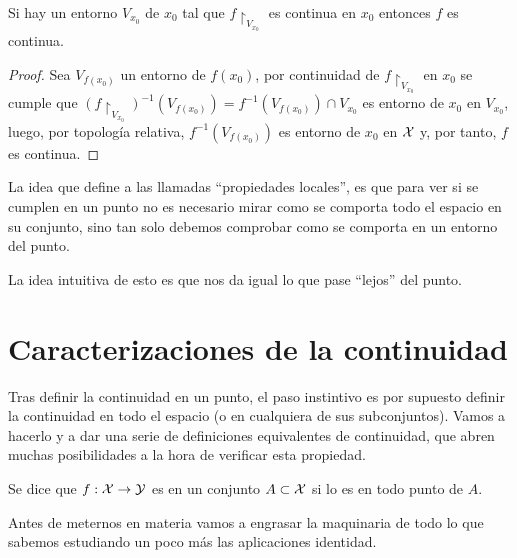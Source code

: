 \begin{prop} Si hay un entorno $V_{x_0}$ de $x_0$ tal que $f\restriction_{V_{x_0}}$ es continua en $x_0$ entonces $f$ es continua.
	
	\begin{proof}
		Sea $V_{f(x_0)}$ un entorno de $f(x_0)$, por continuidad de  $f\restriction_{V_{x_0}}$ en $x_0$ se cumple que $(f\restriction_{V_{x_0}})^{-1}(V_{f(x_0)}) = f^{-1}(V_{f(x_0)})\cap V_{x_0}$ es entorno de $x_0$ en $V_{x_0}$, luego, por topología relativa, $f^{-1}(V_{f(x_0)})$ es entorno de $x_0$ en $\mathcal{X}$ y, por tanto, $f$ es continua.
	\end{proof}
\end{prop}

	La idea que define a las llamadas ``propiedades locales'', es que para ver si se cumplen en un punto no es necesario mirar como se comporta todo el espacio en su conjunto, sino tan solo debemos comprobar como se comporta en un entorno del punto.
	
	La idea intuitiva de esto es que nos da igual lo que pase ``lejos'' del punto.

\section{Caracterizaciones de la continuidad}

Tras definir la continuidad en un punto, el paso instintivo es por supuesto definir la continuidad en todo el espacio (o en cualquiera de sus subconjuntos). Vamos a hacerlo y a dar una serie de definiciones equivalentes de continuidad, que abren muchas posibilidades a la hora de verificar esta propiedad.

\begin{defi}
	Se dice que $f:\mathcal{X}\to\mathcal{Y}$ es  en un conjunto $A\subset \mathcal{X}$ si lo es en todo punto de $A$.
\end{defi}

Antes de meternos en materia vamos a engrasar la maquinaria de todo lo que sabemos estudiando un poco más las aplicaciones identidad.

